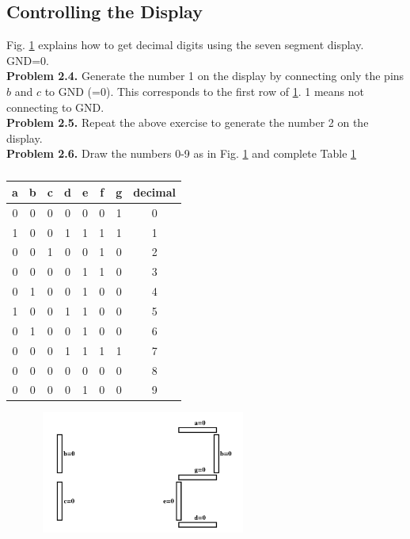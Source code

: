 \documentclass[journal,12pt,twocolumn]{IEEEtran}
\begin{document}
	\subsection{Controlling the Display}
	Fig. \ref{fig:sevenseg12} explains how to get decimal digits using the seven segment display. GND=0.  \\
		\textbf{Problem 2.4.} Generate the number 1 on the display by connecting only the pins $b$ and $c$ to GND (=0). This corresponds to the  first row of \ref{table:arduioport}. 1 means not connecting to GND.\\
		\textbf{Problem 2.5.} Repeat the above exercise to generate the number 2 on the display.\\
		\textbf{Problem 2.6.} Draw the numbers 0-9 as in Fig. \ref{fig:sevenseg12} and complete Table \ref{table:arduioport}
%	
		\begin{table}[h!]
		\begin{center}
			\begin{tabular}{ |c|c|c|c|c|c|c|c| } 
				\hline
				a & b & c & d & e & f & g & decimal \\ 
				\hline
				0 & 0 & 0 & 0 & 0 & 0 & 1 & 0 \\ 
				\hline
				1 & 0 & 0 & 1 & 1 & 1 & 1 & 1 \\ 
				\hline
				0 & 0 & 1 & 0 & 0 & 1 & 0 & 2 \\ 
				\hline
				0 & 0 & 0 & 0 & 1 & 1 & 0 & 3 \\
				\hline
				0 & 1 & 0 & 0 & 1 & 0 & 0 & 4 \\
				\hline
				1 & 0 & 0 & 1 & 1 & 0 & 0 & 5 \\
				\hline
				0 & 1 & 0 & 0 & 1 & 0 & 0 & 6 \\ 
				\hline
				0 & 0 & 0 & 1 & 1 & 1 & 1 & 7 \\
				\hline
				0 & 0 & 0 & 0 & 0 & 0 & 0 & 8 \\
				\hline
				0 & 0 & 0 & 0 & 1 & 0 & 0 & 9 \\ 
				\hline
			\end{tabular}
			\caption{}
			\label{table:arduioport}
		\end{center}
	\end{table}
	\begin{figure}[!h]
		\begin{center}
		\includegraphics[width=7cm,height=4cm]{./dis12}
		\end{center}
		\caption{}
		\label{fig:sevenseg12}
	\end{figure}
\end{document}
